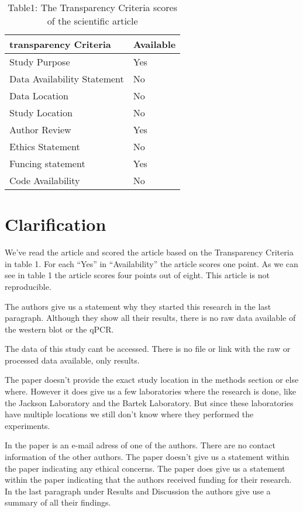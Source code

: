 \documentclass[
]{book}
\begin{document}
\begin{table}

\caption{\label{tab:unnamed-chunk-5}Table1: The Transparency Criteria scores of the scientific article}
\centering
\begin{tabular}[t]{l|l}
\hline
transparency Criteria & Available\\
\hline
Study Purpose & Yes\\
\hline
Data Availability Statement & No\\
\hline
Data Location & No\\
\hline
Study Location & No\\
\hline
Author Review & Yes\\
\hline
Ethics Statement & No\\
\hline
Funcing statement & Yes\\
\hline
Code Availability & No\\
\hline
\end{tabular}
\end{table}

\hypertarget{clarification}{%
\section{Clarification}\label{clarification}}

We've read the article and scored the article based on the Transparency Criteria in table 1. For each ``Yes'' in ``Availability'' the article scores one point. As we can see in table 1 the article scores four points out of eight. This article is not reproducible.

The authors give us a statement why they started this research in the last paragraph.
Although they show all their results, there is no raw data available of the western blot or the qPCR.

The data of this study cant be accessed. There is no file or link with the raw or processed data available, only results.

The paper doesn't provide the exact study location in the methods section or else where. However it does give us a few laboratories where the research is done, like the Jackson Laboratory and the Bartek Laboratory. But since these laboratories have multiple locations we still don't know where they performed the experiments.

In the paper is an e-mail adress of one of the authors. There are no contact information of the other authors.
The paper doesn't give us a statement within the paper indicating any ethical concerns.
The paper does give us a statement within the paper indicating that the authors received funding for their research. In the last paragraph under Results and Discussion the authors give use a summary of all their findings.
\end{document}
